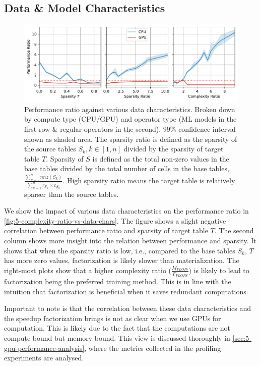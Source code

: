 \subsection{Data \& Model Characteristics}
\begin{figure}[ht]
    \centering
    \includegraphics[width=\linewidth]{chapters/05_cost_estimation/figures/motivation_perf_ratio_vs_data_chars.pdf}
    \caption[Performance ratio for various data characteristics]{Performance ratio against various data characteristics. Broken down by compute type (CPU/GPU) and operator type (ML models in the first row \& regular operators in the second). $99\%$ confidence interval shown as shaded area. The sparsity ratio is defined as the sparsity of the source tables $S_k, k\in[1,n]$ divided by the sparsity of target table $T$. Sparsity of $S$ is defined as the total non-zero values in the base tables divided by the total number of cells in the base tables, $\frac{\sum_{k=1}^{n} nnz(S_k)}{\sum_{k=1}^{n} r_{S_k} \times c_{S_k}}$. High sparsity ratio means the target table is relatively sparser than the source tables.}
    \label{fig:5-complexity-ratio-vs-data-chars}
\end{figure}
We show the impact of various data characteristics on the performance ratio in \autoref{fig:5-complexity-ratio-vs-data-chars}. The figure shows a slight negative correlation between performance ratio and sparsity of target table $T$. The second column shows more insight into the relation between performance and sparsity. It shows that when the sparsity ratio is low, i.e., compared to the base tables $S_k$, $T$ has more zero values, factorization is likely slower than materialization. The right-most plots show that a higher complexity ratio ($\frac{M_{FLOPs}}{F_{FLOPS}}$) is likely to lead to factorization being the preferred training method. This is in line with the intuition that factorization is beneficial when it saves redundant computations.

Important to note is that the correlation between these data characteristics and the speedup factorization brings is not as clear when we use GPUs for computation. This is likely due to the fact that the computations are not compute-bound but memory-bound. This view is discussed thoroughly in \autoref{sec:5-gpu-performance-analysis}, where the metrics collected in the profiling experiments are analysed.


